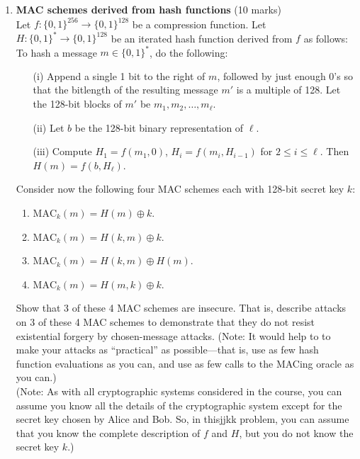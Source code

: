\documentclass[11pt]{article}
\begin{document}
\begin{enumerate}
\newpage
\item {\bf MAC schemes derived from hash functions} (10 marks)\\
Let $f : \{0,1\}^{256} \rightarrow \{0,1\}^{128}$ be a compression function.
Let $H : \{0,1\}^* \rightarrow \{0,1\}^{128}$ be an iterated hash function
derived from $f$ as follows: To hash a message $m \in \{0,1\}^*$, do the
following:
\begin{itemize}
\item[(i)] Append a single 1 bit to the right of $m$, followed by just
      enough $0$'s so that the bitlength of the resulting message $m'$
      is a multiple of 128. Let the 128-bit blocks of $m'$ be
      $m_1, m_2, \ldots, m_{\ell}$.
\item[(ii)] Let $b$ be the 128-bit binary representation of $\ell$.
\item[(iii)] Compute $H_1 = f(m_1,0)$, $H_i = f(m_i,H_{i-1})$ for
             $2 \leq i \leq \ell$. Then $H(m) = f(b,H_\ell)$.
\end{itemize}
Consider now the following four MAC schemes each with 128-bit secret key
$k$:
\begin{enumerate}
\item $\mbox{MAC}_k(m) = H(m) \oplus k$.
\item $\mbox{MAC}_k(m) = H(k,m) \oplus k$.
\item $\mbox{MAC}_k(m) = H(k,m) \oplus H(m)$.
\item $\mbox{MAC}_k(m) = H(m,k) \oplus k$.
\end{enumerate}
Show that 3 of these 4 MAC schemes are insecure. That is, describe
attacks on 3 of these 4 MAC schemes to demonstrate that they do not resist
existential forgery by chosen-message attacks. (Note: It would help to
to make your attacks as ``practical'' as possible---that is, use as
few hash function evaluations as you can, and use as few calls to the
MACing oracle as you can.)\\
(Note: As with all cryptographic systems considered in the course, you
can assume you know all the details of the cryptographic system except
for the secret key chosen by Alice and Bob. So, in thisjjkk problem, you
can assume that you know the complete description of $f$ and $H$, but
you do not know the secret key $k$.)

\end{enumerate}
\end{document}
